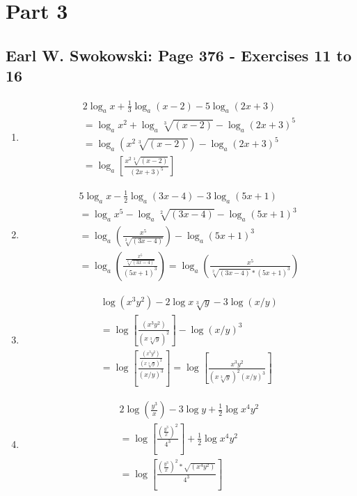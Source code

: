 \documentclass{article}
\begin{document}
\section{Part 3}
\subsection{Earl W. Swokowski: Page 376 - Exercises 11 to 16}

\begin{enumerate}
	\item
	      \begin{align}
		      2\log_ax+\frac{1}{3}\log_a(x-2)-5\log_a(2x+3)   \\
		      =\log_ax^2+\log_a\sqrt[3]{(x-2)}-\log_a(2x+3)^5 \\
		      =\log_a(x^2\sqrt[3]{(x-2)})-\log_a(2x+3)^5      \\
		      =\log_a\left[\frac{x^2\sqrt[3]{(x-2)}}{(2x+3)^5}\right]
	      \end{align}
	\item
	      \begin{align}
		      5\log_ax-\frac{1}{2}\log_a(3x-4)-3\log_a(5x+1)                  \\
		      =\log_ax^5-\log_a\sqrt[2]{(3x-4)}-\log_a(5x+1)^3                \\
		      =\log_a\left(\frac{x^5}{\sqrt[2]{(3x-4)}}\right)-\log_a(5x+1)^3 \\
		      =\log_a\left(\frac{\frac{x^5}{\sqrt[2]{(3x-4)}}}{(5x+1)^3}\right)
		      =\log_a\left(\frac{x^5}{\sqrt[2]{(3x-4)}*(5x+1)^3}\right)
	      \end{align}
	\item
	      \begin{align}
		      \log (x^3y^2)-2\log x\sqrt[3]{y}-3\log (x/y)                     \\
		      =\log\left[\frac{(x^3y^2)}{(x\sqrt[3]{y})^2}\right]-\log (x/y)^3 \\
		      =\log\left[\frac{\frac{(x^3y^2)}{(x\sqrt[3]{y})^2}}{(x/y)^3}\right]
		      =\log\left[\frac{x^3y^2}{(x\sqrt[3]{y})^2(x/y)^3}\right]
	      \end{align}
	\item
	      \begin{align}
		      2\log\left(\frac{y^3}{x}\right)-3\log y+\frac{1}{2}\log x^4y^2           \\
		      = \log\left[\frac{(\frac{y^3}{x})^2}{4^3}\right] +\frac{1}{2}\log x^4y^2 \\
		      = \log\left[\frac{(\frac{y^3}{x})^2*\sqrt{(x^4y^2)}}{4^3}\right]

\end{align}
\end{enumerate}
\end{document}
